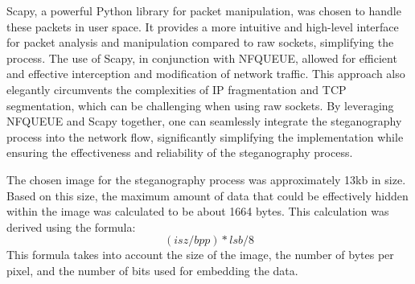 \documentclass[12pt, fleqn, a4paper]{article}
\begin{document}
Scapy, a powerful Python library for packet manipulation, was chosen to handle these packets in user space. It provides a more intuitive and high-level interface for packet analysis and manipulation compared to raw sockets, simplifying the process. The use of Scapy, in conjunction with NFQUEUE, allowed for efficient and effective interception and modification of network traffic. This approach also elegantly circumvents the complexities of IP fragmentation and TCP segmentation, which can be challenging when using raw sockets. By leveraging NFQUEUE and Scapy together, one can seamlessly integrate the steganography process into the network flow, significantly simplifying the implementation while ensuring the effectiveness and reliability of the steganography process.

The chosen image for the steganography process was approximately 13kb in size. Based on this size, the maximum amount of data that could be effectively hidden within the image was calculated to be about 1664 bytes. This calculation was derived using the formula:
\begin{equation}
(isz / bpp) * lsb / 8
\end{equation}
This formula takes into account the size of the image, the number of bytes per pixel, and the number of bits used for embedding the data.
\end{document}

